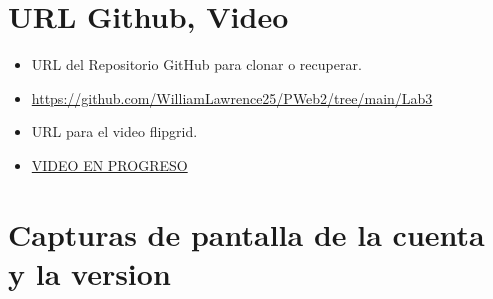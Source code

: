 \documentclass{article}
\begin{document}
	\section{URL Github, Video}
	\begin{itemize}
		\item URL del Repositorio GitHub para clonar o recuperar.
		\item \url{https://github.com/WilliamLawrence25/PWeb2/tree/main/Lab3}
		\item URL para el video flipgrid.
		\item \url{VIDEO EN PROGRESO}	
	\end{itemize}
	\clearpage
	
	\section{Capturas de pantalla de la cuenta y la version}
\end{document}
